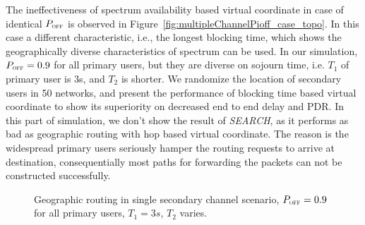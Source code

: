 

The ineffectiveness of spectrum availability based virtual coordinate in case of identical $P_{\textsc{\tiny OFF}}$ is observed in Figure~\ref{fig:multipleChannelPioff_case_topo}.
In this case a different characteristic, i.e., the longest blocking time, which shows the geographically diverse characteristics of spectrum can be used.
In our simulation, $P_{\textsc{\tiny OFF}}=0.9$ for all primary users, but they are diverse on sojourn time, i.e. $T_1$ of primary user is 3s, and $T_2$ is shorter.
We randomize the location of secondary users in 50 networks, and present the performance of blocking time based virtual coordinate to show its superiority on decreased end to end delay and PDR.
In this part of simulation, we don't show the result of \textit{SEARCH}, as it performs as bad as geographic routing with hop based virtual coordinate.
The reason is the widespread primary users seriously hamper the routing requests to arrive at destination, consequentially most paths for forwarding the packets can not be constructed successfully.
\begin{figure}[htb!]
\label{fig:SingleChannelEWT}
\caption{Geographic routing in single secondary channel scenario, $P_{\textsc{\tiny OFF}}=0.9$ for all primary users, $T_1=3s$, $T_2$ varies.}
\end{figure}
%

